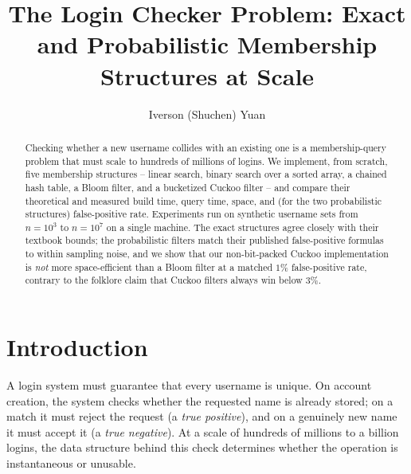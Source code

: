 \documentclass[acmsmall,screen,nonacm=true]{acmart}
\begin{document}
\title{The Login Checker Problem: Exact and Probabilistic Membership
  Structures at Scale}

\author{Iverson (Shuchen) Yuan}

\renewcommand{\shortauthors}{Yuan}

\begin{abstract}
Checking whether a new username collides with an existing one is a
membership-query problem that must scale to hundreds of millions of logins.
We implement, from scratch, five membership structures -- linear search,
binary search over a sorted array, a chained hash table, a Bloom filter, and
a bucketized Cuckoo filter -- and compare their theoretical and measured
build time, query time, space, and (for the two probabilistic structures)
false-positive rate. Experiments run on synthetic username sets from
$n=10^3$ to $n=10^7$ on a single machine. The exact structures agree closely
with their textbook bounds; the probabilistic filters match their published
false-positive formulas to within sampling noise, and we show that our
non-bit-packed Cuckoo implementation is \emph{not} more space-efficient than
a Bloom filter at a matched $1\%$ false-positive rate, contrary to the
folklore claim that Cuckoo filters always win below $3\%$.
\end{abstract}


\maketitle

\section{Introduction}

A login system must guarantee that every username is unique. On account
creation, the system checks whether the requested name is already stored;
on a match it must reject the request (a \emph{true positive}), and on a
genuinely new name it must accept it (a \emph{true negative}). At a scale of
hundreds of millions to a billion logins, the data structure behind this
check determines whether the operation is instantaneous or unusable.
\end{document}
